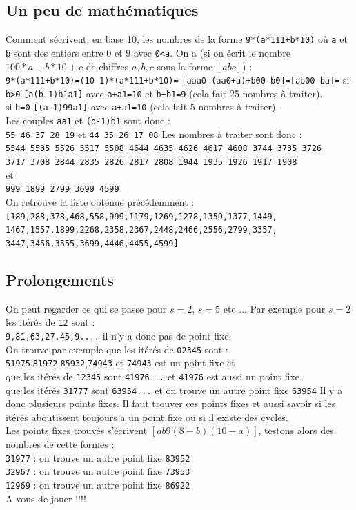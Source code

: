 \documentclass[a4paper,11pt]{book}
\begin{document}
\subsection{Un peu de math\'ematiques}
Comment s\'ecrivent, en base 10, les nombres de la forme {\tt 9*(a*111+b*10)} 
o\`u {\tt a} et {\tt b} sont des entiers entre 0 et 9 avec {\tt 0<a}.
On a (si on \'ecrit le  nombre $100*a+b*10+c$ de chiffres $a,b,c$ 
sous la forme $[abc]$) :\\
{\tt 9*(a*111+b*10)=(10-1)*(a*111+b*10)=}
{\tt [aaa0-(aa0+a)+b00-b0]=[ab00-ba]=}
si {\tt b>0} {\tt [a(b-1)b1a1]} avec {\tt a+a1=10} et {\tt b+b1=9} (cela fait 
25 nombres \`a traiter).\\  
si {\tt b=0} {\tt [(a-1)99a1]} avec {\tt a+a1=10} (cela fait 5 nombres \`a 
traiter).\\ 
Les couples  {\tt aa1} et {\tt (b-1)b1} sont donc :\\
{\tt 55 46 37 28 19} et {\tt 44 35 26 17 08}
Les nombres \`a traiter sont donc :\\
{\tt 5544 5535 5526 5517 5508 4644 4635 4626 4617 4608 3744 3735 3726}\\
{\tt 3717 3708 2844 2835 2826 2817 2808 1944 1935 1926 1917 1908} \\
et\\
{\tt 999 1899 2799 3699 4599}\\
On retrouve la liste obtenue pr\'ec\'edemment :
{\tt [189,288,378,468,558,999,1179,1269,1278,1359,1377,1449,}\\
{\tt 1467,1557,1899,2268,2358,2367,2448,2466,2556,2799,3357,}\\
{\tt 3447,3456,3555,3699,4446,4455,4599]}
\subsection{Prolongements}
On peut regarder ce qui se passe pour $s=2$, $s=5$ etc ...
Par exemple pour $s=2$ les it\'er\'es de {\tt 12} sont :\\
{\tt 9,81,63,27,45,9....} il n'y a donc pas de point fixe.\\
On trouve par exemple que les it\'er\'es de {\tt 02345} sont :\\
{\tt 51975},{\tt 81972},{\tt 85932},{\tt 74943} et {\tt 74943} est un point 
fixe et \\   
que les it\'er\'es de {\tt 12345} sont {\tt 41976...} et {\tt 41976} est aussi un 
point fixe.\\
que les it\'er\'es {\tt 31777}  sont {\tt 63954...} et  on trouve un autre 
point fixe {\tt 63954}
Il y a donc plusieurs points fixes. Il faut trouver ces points fixes et aussi
savoir si les it\'er\'es aboutissent toujours a un point fixe ou si il existe des cycles.\\
Les points fixes trouv\'es s'\'ecrivent $[ab9(8-b)(10-a)]$, testons alors des 
nombres de cette formes :\\
{\tt 31977} : on trouve  un autre point fixe {\tt 83952}\\
{\tt 32967} : on trouve  un autre point fixe {\tt 73953}\\
{\tt 12969} : on trouve  un autre point fixe {\tt 86922}\\
A vous de jouer !!!!
\end{document}
